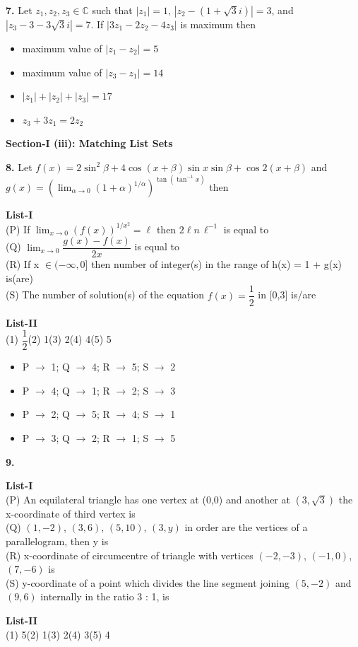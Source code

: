 \documentclass[10pt,twocolumn]{extarticle}
\newenvironment{qoptions}{\begin{itemize}[leftmargin=1.8em,itemsep=2pt,topsep=2pt,label={}]}{\end{itemize}}
\newcommand{\opt}[2]{\item[({#1})] {#2}}
\newcommand{\subsectionhdr}[1]{\par\vspace{3pt}\noindent\textbf{#1}\par\vspace{2pt}}
\begin{document}
\textbf{7.} Let $z_1,z_2,z_3\in\mathbb C$ such that $|z_1|=1$, $|z_2-(1+\sqrt3 i)|=3$, and $|z_3-3-3\sqrt3 i|=7$. If $|3z_1-2z_2-4z_3|$ is maximum then

\begin{qoptions}
\opt{A}{maximum value of $|z_1-z_2|=5$}
\opt{B}{maximum value of $|z_3-z_1|=14$}
\opt{C}{$|z_1|+|z_2|+|z_3|=17$}
\opt{D}{$z_3+3z_1=2z_2$}
\end{qoptions}

\subsectionhdr{Section-I (iii): Matching List Sets}

\textbf{8.} Let $f(x)=2\sin^2\beta+4\cos(x+\beta)\sin x\sin\beta+\cos2(x+\beta)$ and $g(x)=\left(\displaystyle\lim_{\alpha\to0}(1+\alpha)^{1/\alpha}\right)^{\tan(\tan^{-1}x)}$ then

\textbf{List-I}\\
(P) If $\displaystyle\lim_{x\to0}(f(x))^{1/x^2}=\ell$ then $2\ell n\,\ell^{-1}$ is equal to\\
(Q) $\displaystyle\lim_{x\to0}\dfrac{g(x)-f(x)}{2x}$ is equal to\\
(R) If x $\in(-\infty,0]$ then number of integer(s) in the range of h(x) = 1 + g(x) is(are)\\
(S) The number of solution(s) of the equation $f(x)=\dfrac12$ in [0,3] is/are

\textbf{List-II}\\
(1) $\dfrac12$\quad (2) 1\quad (3) 2\quad (4) 4\quad (5) 5

\begin{qoptions}
\opt{A}{P $\to$ 1; Q $\to$ 4; R $\to$ 5; S $\to$ 2}
\opt{B}{P $\to$ 4; Q $\to$ 1; R $\to$ 2; S $\to$ 3}
\opt{C}{P $\to$ 2; Q $\to$ 5; R $\to$ 4; S $\to$ 1}
\opt{D}{P $\to$ 3; Q $\to$ 2; R $\to$ 1; S $\to$ 5}
\end{qoptions}

\textbf{9.}

\textbf{List-I}\\
(P) An equilateral triangle has one vertex at (0,0) and another at $(3,\sqrt3)$ the x-coordinate of third vertex is\\
(Q) $(1,-2)$, $(3,6)$, $(5,10)$, $(3,y)$ in order are the vertices of a parallelogram, then y is\\
(R) x-coordinate of circumcentre of triangle with vertices $(-2,-3)$, $(-1,0)$, $(7,-6)$ is\\
(S) y-coordinate of a point which divides the line segment joining $(5,-2)$ and $(9,6)$ internally in the ratio 3 : 1, is

\textbf{List-II}\\
(1) 5\quad (2) 1\quad (3) 2\quad (4) 3\quad (5) 4
\end{document}
